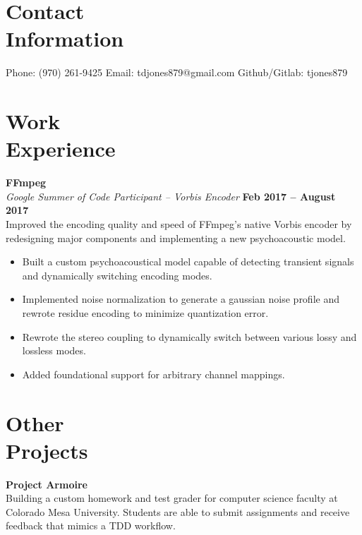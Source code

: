 \documentclass[margin,line]{resume}
\begin{document}
\begin{resume}
    \section{\mysidestyle Contact\\Information}

    Phone: (970) 261-9425 \hfill Email: tdjones879@gmail.com  \hfill Github/Gitlab: tjones879\vspace{0mm}\\\vspace{-4.5mm}

    \section{\mysidestyle Work\\Experience}

    \textbf{FFmpeg} \vspace{2mm}\\\vspace{1mm}%
    \textsl{Google Summer of Code Participant -- Vorbis Encoder} \hfill \textbf{Feb 2017 -- August 2017}\\
    Improved the encoding quality and speed of FFmpeg's native Vorbis
    encoder by redesigning major components and implementing a new
    psychoacoustic model.

	\begin{itemize}
	\item Built a custom psychoacoustical model capable of detecting
              transient signals and dynamically switching encoding modes.
	\item Implemented noise normalization to generate a gaussian noise
	      profile and rewrote residue encoding to minimize quantization
	      error.
	\item Rewrote the stereo coupling to dynamically switch between
	      various lossy and lossless modes.
	\item Added foundational support for arbitrary channel mappings.
	\end{itemize}

    \section{\mysidestyle Other\\Projects}

    \textbf{Project Armoire}\\
    Building a custom homework and test grader for computer science faculty at
    Colorado Mesa University. Students are able to submit assignments and receive
    feedback that mimics a TDD workflow.


\end{resume}
\end{document}
